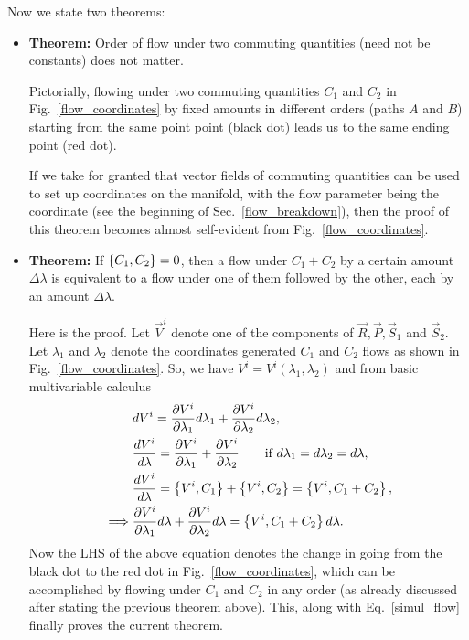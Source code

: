 Now we state two theorems:
\begin{itemize}
\item \textbf{Theorem:} Order of flow under two commuting quantities
(need not be constants) does not matter.


Pictorially, flowing under two commuting quantities $C_1$ and $C_2$ 
in Fig.~\ref{flow_coordinates}
by fixed amounts in different orders (paths $A$ and $B$) 
starting from the same point 
point (black dot) leads us to the same ending point (red dot).




If we take for granted that vector fields of commuting 
quantities can be used to
set up coordinates on the manifold, with the 
flow parameter being the coordinate (see the 
beginning of Sec.~\ref{flow_breakdown}),
then the proof of this theorem
becomes almost self-evident from Fig.~\ref{flow_coordinates}.


\item \textbf{Theorem:} If $\left\lbrace C_1, C_2 \right\rbrace = 0$, then a flow under 
$C_1 + C_2$ by a certain amount $\Delta \lambda$ is equivalent 
to a flow under one of them followed by the other, each by an amount
$\Delta \lambda$.


Here is the proof. Let $\vec{V}^i$ denote one of the 
components of $\vec{R}, \vec{P}, \vec{S}_1$ and $\vec{S}_2$. Let
$\lambda_1$ and $\lambda_2$ denote the coordinates generated $C_1$
and $C_2$ flows as shown in Fig.~\ref{flow_coordinates}. So, we have
$V^i = V^i(\lambda_1, \lambda_2)$ and from basic multivariable
calculus
\begin{align}
& dV^i    = \frac{\partial V^i}{\partial \lambda_1} d \lambda_1 + \frac{\partial V^i}{\partial \lambda_2}   d \lambda_2   ,\\
&  \frac{dV^i}{d \lambda}    = \frac{\partial V^i}{\partial \lambda_1} + \frac{\partial V^i}{\partial \lambda_2}     \quad \quad  \text{if~}d\lambda_1 = d \lambda_2 = d \lambda  ,  \\
& \frac{dV^i}{d \lambda}   =  \left\lbrace V^i , C_1 \right\rbrace +  \left\lbrace V^i , C_2 \right\rbrace = \left\lbrace V^i , C_1 + C_2 \right\rbrace ,
\\
\implies  &  \frac{\partial V^i}{\partial \lambda_1} d \lambda + \frac{\partial V^i}{\partial \lambda_2}   d \lambda   =    \left\lbrace V^i , C_1 + C_2 \right\rbrace  d \lambda  .    \label{simul_flow}
\end{align}
Now the LHS of the above equation denotes the change in going from the
black dot to the red dot in Fig.~\ref{flow_coordinates},
which can be accomplished by flowing under $C_1$ and $C_2$ in any order 
(as already discussed after stating the previous theorem above).
This, along with Eq.~\eqref{simul_flow} finally proves the current theorem.
\end{itemize}




